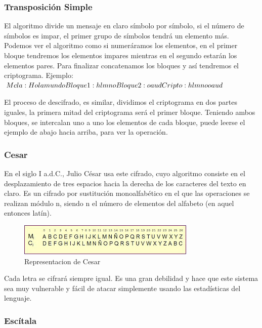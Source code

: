 \documentclass[11pt, conference]{IEEEtran}
\begin{document}
\subsubsection{Transposición Simple}
El algoritmo divide un mensaje en claro símbolo por símbolo, si el número de símbolos es impar, el primer grupo de símbolos tendrá un elemento más. Podemos ver el algoritmo como si numeráramos los elementos, en el primer bloque tendremos los elementos impares mientras en el segundo estarán los elementos pares. Para finalizar concatenamos los bloques y así tendremos el criptograma. 
Ejemplo: \\
$
Mcla: Hola mundo \\
Bloque1: hlmno \\
Bloque2: oaud \\
Cripto: hlmnooaud\\ 
$

El proceso de descifrado, es similar, dividimos el criptograma en dos partes iguales, la primera mitad del criptograma será el primer bloque. Teniendo ambos bloques, se intercalan uno a uno los elementos de cada bloque, puede leerse el ejemplo de abajo hacia arriba, para ver la operación.

\subsubsection{Cesar}
En el siglo I a.d.C., Julio César usa este cifrado, cuyo algoritmo consiste en el desplazamiento de tres espacios hacia la derecha de los caracteres del texto en claro. Es un cifrado por sustitución monoalfabético en el que las operaciones se realizan módulo n, siendo n el número de elementos del alfabeto (en aquel entonces latín).

\begin{figure}[h]
	\begin{center}
		\includegraphics[scale=0.7]{5.jpg}
		\caption{Representacion de Cesar} 
	\end{center}
\end{figure}

Cada letra se cifrará siempre igual. Es una gran debilidad y hace que este sistema sea muy vulnerable y fácil de atacar simplemente usando las estadísticas del lenguaje.

\subsubsection{Escítala}
\end{document}
